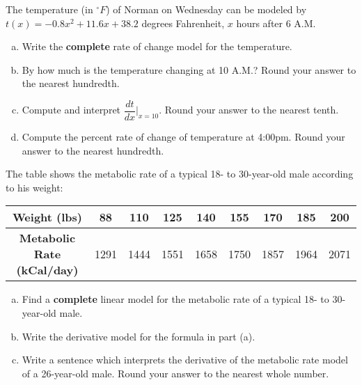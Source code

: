 \documentclass[notes]{subfiles}
\begin{document}
		\begin{ex}
			The temperature (in $^\circ F$) of Norman on Wednesday can be modeled by $t(x) = -0.8x^2+11.6x+38.2$ degrees Fahrenheit, $x$ hours after 6 A.M.
			\begin{enumerate}[(a)]
				\item Write the \textbf{complete} rate of change model for the temperature.  
 				\item By how much is the temperature changing at 10 A.M.?  Round your answer to the nearest hundredth.  
 				\item Compute and interpret $\dfrac{dt}{dx}\bigg|_{x = 10}$. Round your answer to the nearest tenth.  
 				\item Compute the percent rate of change of temperature at 4:00pm.  Round your answer to the nearest hundredth.  
 			\end{enumerate}
 		\end{ex}
 			\newpage
 			
		\begin{ex}
			The table shows the metabolic rate of a typical 18- to 30-year-old male according to his weight:
			\begin{center}
				{\renewcommand{\arraystretch}{1.2}
				\begin{tabular}{|c|c|c|c|c|c|c|c|c|}\hline
					\textbf{Weight (lbs)} & 88 & 110 & 125 & 140 & 155 & 170 & 185 & 200 \\ \hline
					\textbf{Metabolic Rate (kCal/day)} & 1291 & 1444 & 1551 & 1658 & 1750 & 1857 & 1964 & 2071\\ \hline
				\end{tabular}
				}
			\end{center}
			\begin{enumerate}[(a)]
				\item Find a \textbf{complete} linear model for the metabolic rate of a typical 18- to 30-year-old male. 
					\vs{1}
				\item Write the derivative model for the formula in part (a).  
					\vs{1}
 				\item Write a sentence which interprets the derivative of the metabolic rate model of a 26-year-old male.  Round your answer to the nearest whole number.  
 					\vs{1}
 			\end{enumerate}
 		\end{ex}
	\clearpage
\end{document}
